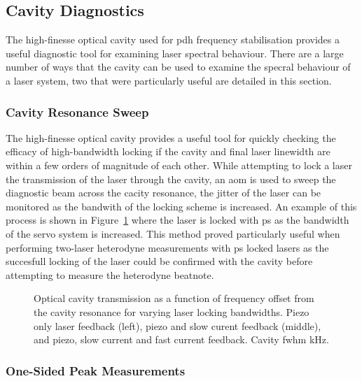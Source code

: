 \subsection{Cavity Diagnostics}

The high-finesse optical cavity used for \gls{pdh} frequency stabilisation provides a useful diagnostic tool for examining laser spectral behaviour.
There are a large number of ways that the cavity can be used to examine the specral behaviour of a laser system, two that were particularly useful are detailed in this section.

\subsubsection{Cavity Resonance Sweep}

The high-finesse optical cavity provides a useful tool for quickly checking the efficacy of high-bandwidth locking if the cavity and final laser linewidth are within a few orders of magnitude of each other.
While attempting to lock a laser the transmission of the laser through the cavity, an \gls{aom} is used to sweep the diagnostic beam across the cacity resonance, the jitter of the laser can be monitored as the bandwith of the locking scheme is increased.
An example of this process is shown in Figure~\ref{figure:cavity_scans} where the laser is locked with \gls{ps} as the bandwidth of the servo system is increased.
This method proved particularly useful when performing two-laser heterodyne measurements with \gls{ps} locked lasers as the succesfull locking of the laser could be confirmed with the cavity before attempting to measure the heterodyne beatnote.

\begin{figure}
\center

\caption{Optical cavity transmission as a function of frequency offset from the cavity resonance for varying laser locking bandwidths. Piezo only laser feedback (left), piezo and slow curent feedback (middle), and piezo, slow current and fast current feedback. Cavity \gls{fwhm} \unit[72]{kHz}.}
\label{figure:cavity_scans}
\end{figure}

\subsubsection{One-Sided Peak Measurements}\label{section:one_sided_peak}

